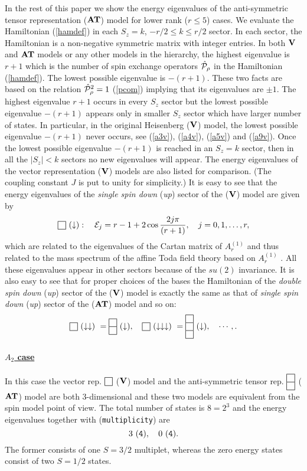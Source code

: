 \documentclass[a4paper,12pt]{article}
\def\sqr#1#2{{\vcenter{\hrule height.#2pt
      \hbox{\vrule width.#2pt height#1pt \kern#1pt
          \vrule width.#2pt}
      \hrule height.#2pt}}}
\def\twosqr#1#2{{\vcenter{\hrule height.#2pt
      \hbox{\vrule width.#2pt height#1pt \kern#1pt
          \vrule width.#2pt}
      \hrule height.#2pt
      \hbox{\vrule width.#2pt height#1pt \kern#1pt
          \vrule width.#2pt}
      \hrule height.#2pt}}}
\def\thrsqr#1#2{{\vcenter{\hrule height.#2pt
      \hbox{\vrule width.#2pt height#1pt \kern#1pt
          \vrule width.#2pt}
      \hrule height.#2pt
\hbox{\vrule width.#2pt height#1pt \kern#1pt
          \vrule width.#2pt}
      \hrule height.#2pt
      \hbox{\vrule width.#2pt height#1pt \kern#1pt
          \vrule width.#2pt}
      \hrule height.#2pt}}}
\begin{document}
In the rest of this paper we show the energy eigenvalues of the
anti-symmetric
tensor representation (${\bf AT}$) model for lower rank ($r\le5$) cases.
We evaluate the Hamiltonian (\ref{hamdef}) in each $S_z=k$, $-r/2\le k\le
r/2$
sector. In each sector, the Hamiltonian is a non-negative symmetric matrix
with integer entries. In both ${\bf V}$ and
${\bf AT}$ models or any other models
in the hierarchy, the highest eigenvalue is $r+1$ which is the number of
spin
exchange operators
$\hat{\cal P}_\rho$ in  the Hamiltonian (\ref{hamdef}). The lowest possible
eigenvalue is
$-(r+1)$. These two facts are based on the relation
$\hat{\cal P}_\rho^2=1$ (\ref{pcom}) implying that its eigenvalues are
$\pm1$.
The highest eigenvalue $r+1$ occurs in every $S_z$
sector but the lowest possible
eigenvalue $-(r+1)$ appears only in smaller $S_z$
sector which have larger number of states. In particular, in the original
Heisenberg (${\bf V}$) model,
the lowest possible eigenvalue $-(r+1)$ never occurs,
see (\ref{a3v}), (\ref{a4v}), (\ref{a5v}) and (\ref{a9v}).
Once the lowest possible eigenvalue $-(r+1)$ is reached in an $S_z=k$
sector,  then in all the $|S_z|<k$ sectors no new eigenvalues will appear.
The energy eigenvalues of the vector representation
(${\bf V}$) models are also
listed for comparison.
(The coupling constant $J$ is put to unity for simplicity.)
It is easy to see that the energy eigenvalues of the
{\em single spin down\/}
({\em up\/}) sector of the (${\bf V}$) model are given by
\begin{equation}
{\sqr{9}5}\ (\downarrow):\quad {\cal E}_j=
r-1+2\cos{2j\pi\over{(r+1)}},\quad j=0,1,\ldots,r,
\end{equation}
which are related to the eigenvalues of the Cartan matrix of $A_r^{(1)}$ and
thus related to the mass spectrum of the affine Toda field theory based on
$A_r^{(1)}$ \cite{atft}.
All these eigenvalues appear in other sectors because of
the $su(2)$ invariance. It is also easy to see that for proper choices of
the bases
the Hamiltonian of the
{\em double spin down\/} ({\em up\/})
sector of the (${\bf V}$) model is exactly the same as that of
{\em single spin down\/} ({\em up\/})
sector of the (${\bf AT}$) model and so on:
\begin{equation}
{\sqr{9}5} \ (\downarrow\downarrow)\ ={\twosqr{9}5} \ (\downarrow),\quad
{\sqr{9}5} \ (\downarrow\downarrow\downarrow)\
={\thrsqr{9}5} \ (\downarrow),\quad
\cdots, .
\end{equation}


\paragraph{\underline{$A_2$ case}} In this case the vector rep.  $\sqr{9}5$
(${\bf V}$)  model and the
anti-symmetric tensor rep. $\twosqr{9}5$
(${\bf AT}$) model are both 3-dimensional
and these two models are equivalent from the spin model point of view.
The total number of states is $8=2^3$ and
the energy eigenvalues  together with
({\tt multiplicity}) are
\begin{equation}
3\ ({\tt 4}),\quad 0\ ({\tt 4}).
\end{equation}
The former consists of one $S=3/2$ multiplet,
whereas the zero energy states consist of two $S=1/2$ states.
\end{document}
